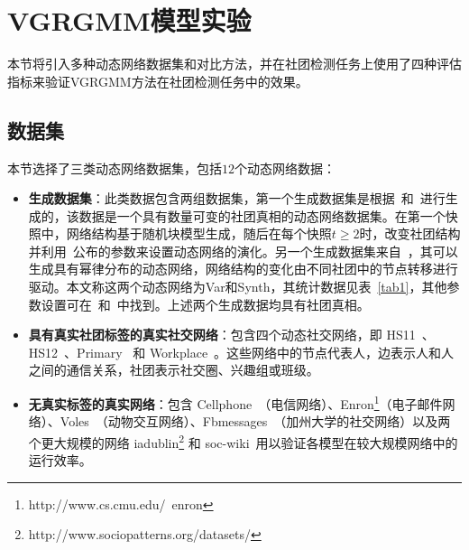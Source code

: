 \section{VGRGMM模型实验\label{chap6:experiment}}

本节将引入多种动态网络数据集和对比方法，并在社团检测任务上使用了四种评估指标来验证VGRGMM方法在社团检测任务中的效果。

\subsection{数据集}
本节选择了三类动态网络数据集，包括$12$个动态网络数据：
\begin{itemize}
    \item \textbf{生成数据集}：此类数据包含两组数据集，第一个生成数据集是根据~\cite{kim2009particle}和~\cite{Lin.2009.Tseng}进行生成的，该数据是一个具有数量可变的社团真相的动态网络数据集。在第一个快照中，网络结构基于随机块模型生成，随后在每个快照$t \ge 2$时，改变社团结构并利用~\cite{Lin.2009.Tseng}公布的参数来设置动态网络的演化。另一个生成数据集来自~\cite{ditursi2017local}，其可以生成具有幂律分布的动态网络，网络结构的变化由不同社团中的节点转移进行驱动。本文称这两个动态网络为Var和Synth，其统计数据见表~\ref{tab1}，其他参数设置可在~\cite{kim2009particle}和~\cite{Lin.2009.Tseng}中找到。上述两个生成数据均具有社团真相。
    \item \textbf{具有真实社团标签的真实社交网络}：包含四个动态社交网络，即 HS11~\cite{malizia2025hyperedge}、HS12~\cite{malizia2025hyperedge}、Primary~\cite{malizia2025hyperedge} 和 Workplace~\cite{genois2014data}。这些网络中的节点代表人，边表示人和人之间的通信关系，社团表示社交圈、兴趣组或班级。
    \item \textbf{无真实标签的真实网络}：包含 Cellphone~\cite{folino2013evolutionary}（电信网络）、Enron\footnote{http://www.cs.cmu.edu/~enron}（电子邮件网络）、Voles~\cite{rossi2015network}（动物交互网络）、Fbmessages~\cite{rossi2015network}（加州大学的社交网络）以及两个更大规模的网络 iadublin\footnote{http://www.sociopatterns.org/datasets/} 和 soc-wiki~\cite{rossi2015network}用以验证各模型在较大规模网络中的运行效率。
\end{itemize}

